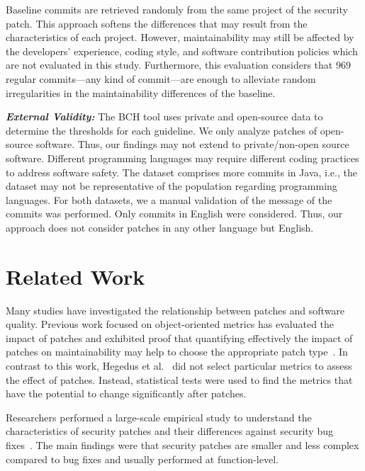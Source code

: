 \documentclass[smallextended]{svjour3}       %
\begin{document}
Baseline commits are retrieved randomly from 
the same project of the security patch.
This approach softens the differences
that may result from the characteristics of each project. However,
maintainability may still be affected by the developers' experience, coding
style, and software contribution policies which are not evaluated in this study.
Furthermore, this evaluation considers that $969$ regular commits---any kind
of commit---are enough to
alleviate random irregularities in the maintainability differences of the
baseline. 
%

\textit{\textbf{External Validity:}} The BCH tool uses private and open-source data to determine the thresholds for each guideline. We only analyze patches of open-source software.
Thus, our findings may not extend to private/non-open source software. Different programming 
languages may require different coding practices to address software safety. The 
dataset comprises more commits in Java, i.e., the dataset may not be representative 
of the population regarding programming languages. For both datasets, we a manual validation of the message of the commits was performed. Only commits in English were considered. Thus, our approach does not consider 
patches in any other language but English.

\section{Related Work}\label{sec:rw}

Many studies have investigated the relationship between patches and
software quality. Previous work focused on object-oriented metrics has evaluated the
impact of patches and exhibited proof that quantifying effectively the
impact of patches on maintainability may help to choose the appropriate
patch type~\cite{1167822}. In contrast to this work, Hegedus et
al.~\cite{HEGEDUS2018313} did not select particular metrics to assess the effect
of patches. Instead, statistical tests were used to find the metrics that
have the potential to change significantly after patches. 

Researchers
performed a large-scale empirical study to understand the characteristics of security patches
and their differences against security bug fixes~\cite{10.1145/3133956.3134072}.
The main findings were that security patches are smaller and less complex compared
to bug fixes and usually performed at function-level.
\end{document}
